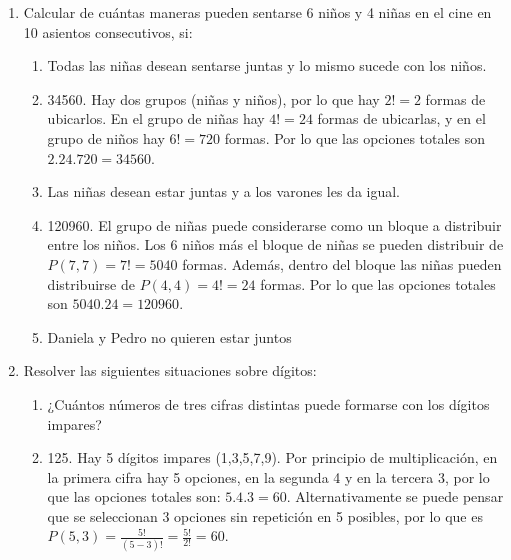 \documentclass[a4paper]{article}
\newcommand{\answer}{\item[**]}
\newcommand{\exercise}{\item}
\begin{document}
\begin{enumerate}
\begin{enumerate} [label=(\alph*)]
		\item Para confeccionar un examen, se dispone de 3 problemas de geometría, 4 de combinatoria y 2 de álgebra. De cuántas maneras pueden ordenarse los problemas si los que corresponden a un mismo tema deben aparecer en forma consecutiva?
		\answer 1728. Hay 3 temas, por lo que se pueden ordenar de $3! = 6$ formas. En el tema de geometría $3! = 6$ formas de ordenar los problemas, en el de combinatoria hay $4!=24$ formas de ordenarlos, en el de álgebra hay $2!=2$ formas. Por lo que el total de opciones es $6.6.24.2 = 1728$

	\end{enumerate}

	\exercise Calcular de cuántas maneras pueden sentarse 6 niños y 4 niñas en el cine en 10 asientos consecutivos, si:
	\begin{enumerate} [label=(\alph*)]
		\item Todas las niñas desean sentarse juntas y lo mismo sucede con los niños.
		\answer 34560. Hay dos grupos (niñas y niños), por lo que hay $2!=2$ formas de ubicarlos. En el grupo de niñas hay $4!=24$ formas de ubicarlas, y en el grupo de niños hay $6!=720$ formas. Por lo que las opciones totales son $2.24.720=34560$.

		\item Las niñas desean estar juntas y a los varones les da igual.
		\answer 120960. El grupo de niñas puede considerarse como un bloque a distribuir entre los niños. Los 6 niños más el bloque de niñas se pueden distribuir de $P(7,7)=7!=5040$ formas. Además, dentro del bloque las niñas pueden distribuirse de $P(4,4)=4!=24$ formas. Por lo que las opciones totales son $5040.24=120960$.

		\item Daniela y Pedro no quieren estar juntos

	\end{enumerate}

	\exercise Resolver las siguientes situaciones sobre dígitos:
	\begin{enumerate} [label=(\alph*)]
		\item ¿Cuántos números de tres cifras distintas puede formarse con los dígitos impares?
		\answer 125. Hay 5 dígitos impares (1,3,5,7,9). Por principio de multiplicación, en la primera cifra hay 5 opciones, en la segunda 4 y en la tercera 3, por lo que las opciones totales son: $5.4.3 = 60$. Alternativamente se puede pensar que se seleccionan 3 opciones sin repetición en 5 posibles, por lo que es $P(5,3)=\frac{5!}{(5-3)!}=\frac{5!}{2!}=60$.


\end{enumerate}
\end{enumerate}
\end{document}
